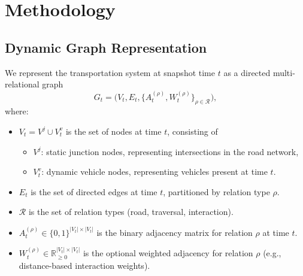 \section{Methodology}

\subsection{Dynamic Graph Representation}
We represent the transportation system at snapshot time $t$ as a directed multi-relational graph
\begin{equation}
G_t = \big(V_t, E_t, \{A_t^{(\rho)}, W_t^{(\rho)}\}_{\rho\in\mathcal{R}}\big),
\end{equation}
where:
\begin{itemize}
    \item $V_t = V^j \cup V_t^v$ is the set of nodes at time $t$, consisting of
        \begin{itemize}
            \item $V^j$: static junction nodes, representing intersections in the road network,
            \item $V_t^v$: dynamic vehicle nodes, representing vehicles present at time $t$.
        \end{itemize}
    \item $E_t$ is the set of directed edges at time $t$, partitioned by relation type $\rho$.
    \item $\mathcal{R}$ is the set of relation types (road, traversal, interaction).
    \item $A_t^{(\rho)} \in \{0,1\}^{|V_t|\times |V_t|}$ is the binary adjacency matrix for relation $\rho$ at time $t$.
    \item $W_t^{(\rho)} \in \mathbb{R}_{\ge 0}^{|V_t|\times |V_t|}$ is the optional weighted adjacency for relation $\rho$ (e.g., distance-based interaction weights).
\end{itemize}

